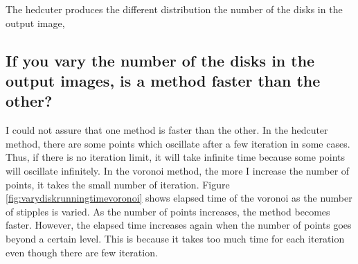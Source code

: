 \documentclass[11pt]{article}
\begin{document}
The hedcuter produces the different distribution the number of the disks in the output image, 


\subsection{If you vary the number of the disks in the output images, is a method faster than the other?}%
I could not assure that one method is faster than the other. In the hedcuter method, there are some points which oscillate after a few iteration in some cases. Thus, if there is no iteration limit, it will take infinite time because some points will oscillate infinitely. In the voronoi method, the more I increase the number of points, it takes the small number of iteration. Figure \ref{fig:varydiskrunningtimevoronoi} shows elapsed time of the voronoi as the number of stipples is varied. As the number of points increases, the method becomes faster. However, the elapsed time increases again when the number of points goes beyond a certain level. This is because it takes too much time for each iteration even though there are few iteration.
\end{document}
